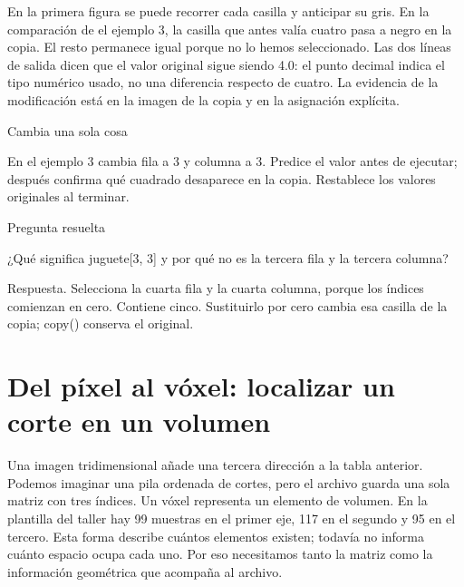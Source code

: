 


En la primera figura se puede recorrer cada casilla y anticipar su gris. En la comparación de el ejemplo 3, la casilla que antes valía cuatro pasa a negro en la copia. El resto permanece igual porque no lo hemos seleccionado. Las dos líneas de salida dicen que el valor original sigue siendo 4.0: el punto decimal indica el tipo numérico usado, no una diferencia respecto de cuatro. La evidencia de la modificación está en la imagen de la copia y en la asignación explícita.



\begin{Practica}{Cambia una sola cosa}

En el ejemplo 3 cambia fila a 3 y columna a 3. Predice el valor antes de ejecutar; después confirma qué cuadrado desaparece en la copia. Restablece los valores originales al terminar.


\end{Practica}


\begin{Idea}{Pregunta resuelta}

¿Qué significa juguete[3, 3] y por qué no es la tercera fila y la tercera columna?


Respuesta. Selecciona la cuarta fila y la cuarta columna, porque los índices comienzan en cero. Contiene cinco. Sustituirlo por cero cambia esa casilla de la copia; copy() conserva el original.


\end{Idea}

\clearpage

\section{Del píxel al vóxel: localizar un corte en un volumen}


Una imagen tridimensional añade una tercera dirección a la tabla anterior. Podemos imaginar una pila ordenada de cortes, pero el archivo guarda una sola matriz con tres índices. Un vóxel representa un elemento de volumen. En la plantilla del taller hay 99 muestras en el primer eje, 117 en el segundo y 95 en el tercero. Esta forma describe cuántos elementos existen; todavía no informa cuánto espacio ocupa cada uno. Por eso necesitamos tanto la matriz como la información geométrica que acompaña al archivo.


